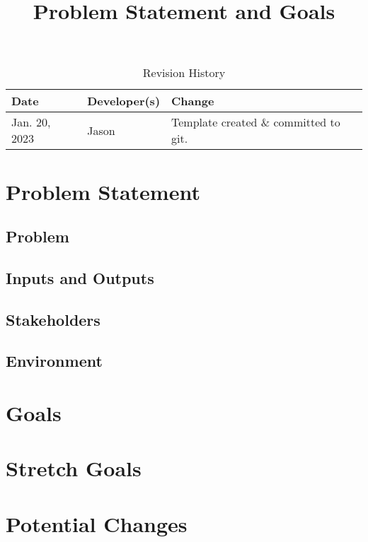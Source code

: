 \documentclass{article}
\title{Problem Statement and Goals\\\progname{}}
\author{\authname}
\date{}
\begin{document}
\maketitle

\begin{table}[hp]
    \caption{Revision History} \label{TblRevisionHistory}
    \begin{tabularx}{\textwidth}{llX}
        \toprule
        \textbf{Date} & \textbf{Developer(s)} & \textbf{Change}                       \\
        \midrule
        Jan. 20, 2023 & Jason                 & Template created \& committed to git. \\
        \bottomrule
    \end{tabularx}
\end{table}

\section{Problem Statement}
\label{problem-statement}



\subsection{Problem}
\label{problem-statement:problem}

\subsection{Inputs and Outputs}
\label{problem-statement:inputs-and-outputs}


\subsection{Stakeholders}
\label{problem-statement:stakeholders}

\subsection{Environment}
\label{problem-statement:environment}


\section{Goals}
\label{goals}

\section{Stretch Goals}
\label{goals:stretch-goals}

\section{Potential Changes}
\label{potential-changes}
\end{document}
